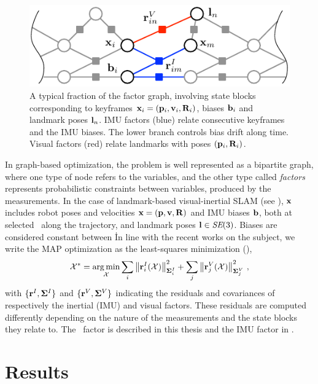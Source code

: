 \begin{figure}
    \centering
    \includegraphics[scale=1.3]{figures/absolute/graph}
    \caption{A typical fraction of the factor graph, involving state blocks corresponding to keyframes ${\bf x}_i=({\bf p}_i,{\bf v}_i,{\bf R}_i)$, biases ${\bf b}_i$ and landmark poses ${\bf l}_n$. 
    IMU factors (blue) relate consecutive keyframes and the IMU biases.
    The lower branch controls bias drift along time.
    Visual factors (red) relate landmarks with poses $({\bf p}_i,{\bf R}_i)$.}
    \label{fig:graph}
\end{figure}

In graph-based optimization, the problem is well represented as a bipartite graph, where one type of node refers to the variables, 
and the other type called \emph{factors} represents probabilistic constraints between variables, produced by the measurements.
%
In the case of landmark-based visual-inertial SLAM (see ), ${\bf x}$ includes robot poses and velocities 
${\bf x}=({\bf p},{\bf v},{\bf R})$ and IMU biases ${\bf b}$, both at selected \keyframes\ along the trajectory, and landmark poses ${\bf l} \in \textit{SE}(3)$.
Biases are considered constant between \keyframes\.
%
In line with the recent works on the subject, we write the MAP optimization as the least-squares minimization (),
%
\begin{align}\label{equ:least_squares}
    \mathcal{X}^* = \operatorname*{arg\,min}_{\mathcal{X}} 
    \sum_i {\left\|{\bf r}^I_i(\mathcal{X})\right\|}_{{\bm \Sigma}^I_i}^2
    +
    \sum_j {\left\|{\bf r}^V_j(\mathcal{X})\right\|}_{{\bm \Sigma}^V_j}^2
~,
\end{align}
%
with $\{{\bf r}^I,{\bm \Sigma}^I\}$ and $\{{\bf r}^V,{\bm \Sigma}^V\}$ indicating the residuals and covariances of respectively the inertial (IMU) and visual factors.
These residuals are computed differently depending on the nature of the measurements and the state blocks they relate to. 
The \apriltag\ factor is described in this thesis  and the IMU factor in .


\section{Results}

